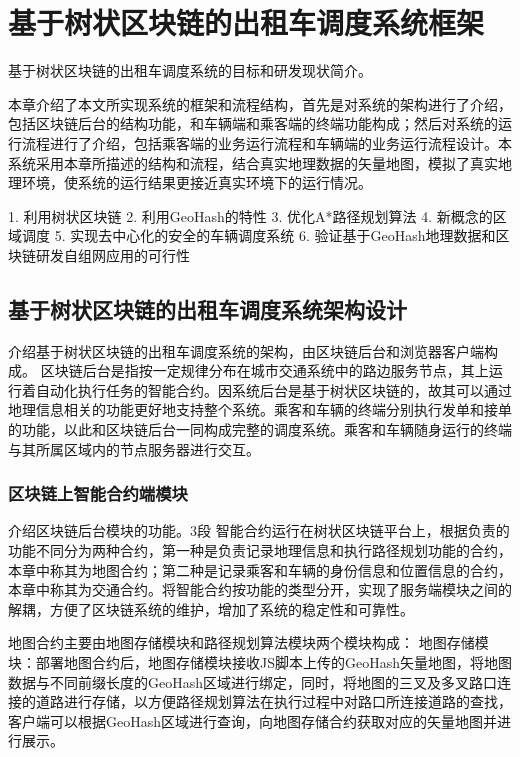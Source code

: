 \chapter{基于树状区块链的出租车调度系统框架}
基于树状区块链的出租车调度系统的目标和研发现状简介。

本章介绍了本文所实现系统的框架和流程结构，首先是对系统的架构进行了介绍，包括区块链后台的结构功能，和车辆端和乘客端的终端功能构成；然后对系统的运行流程进行了介绍，包括乘客端的业务运行流程和车辆端的业务运行流程设计。本系统采用本章所描述的结构和流程，结合真实地理数据的矢量地图，模拟了真实地理环境，使系统的运行结果更接近真实环境下的运行情况。

1. 利用树状区块链
2. 利用GeoHash的特性
3. 优化A*路径规划算法
4. 新概念的区域调度
5. 实现去中心化的安全的车辆调度系统
6. 验证基于GeoHash地理数据和区块链研发自组网应用的可行性

\section{基于树状区块链的出租车调度系统架构设计}
介绍基于树状区块链的出租车调度系统的架构，由区块链后台和浏览器客户端构成。
区块链后台是指按一定规律分布在城市交通系统中的路边服务节点，其上运行着自动化执行任务的智能合约。因系统后台是基于树状区块链的，故其可以通过地理信息相关的功能更好地支持整个系统。乘客和车辆的终端分别执行发单和接单的功能，以此和区块链后台一同构成完整的调度系统。乘客和车辆随身运行的终端与其所属区域内的节点服务器进行交互。

\subsection{区块链上智能合约端模块}
介绍区块链后台模块的功能。3段
智能合约运行在树状区块链平台上，根据负责的功能不同分为两种合约，第一种是负责记录地理信息和执行路径规划功能的合约，本章中称其为地图合约；第二种是记录乘客和车辆的身份信息和位置信息的合约，本章中称其为交通合约。将智能合约按功能的类型分开，实现了服务端模块之间的解耦，方便了区块链系统的维护，增加了系统的稳定性和可靠性。

地图合约主要由地图存储模块和路径规划算法模块两个模块构成：
地图存储模块：部署地图合约后，地图存储模块接收JS脚本上传的GeoHash矢量地图，将地图数据与不同前缀长度的GeoHash区域进行绑定，同时，将地图的三叉及多叉路口连接的道路进行存储，以方便路径规划算法在执行过程中对路口所连接道路的查找，客户端可以根据GeoHash区域进行查询，向地图存储合约获取对应的矢量地图并进行展示。

